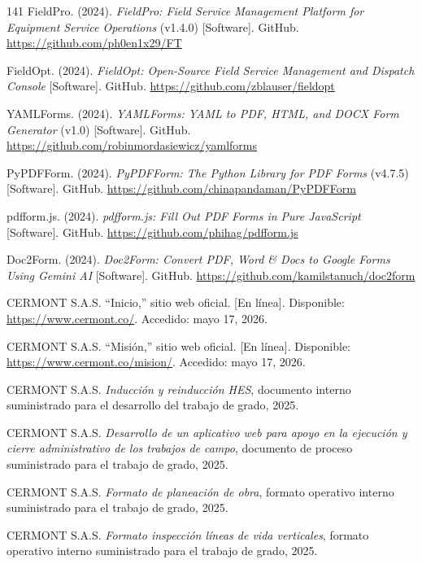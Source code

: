 \begin{thebibliography}{141}
FieldPro. (2024). \textit{FieldPro: Field Service Management Platform for Equipment Service Operations} (v1.4.0) [Software]. GitHub. \url{https://github.com/ph0en1x29/FT}

FieldOpt. (2024). \textit{FieldOpt: Open-Source Field Service Management and Dispatch Console} [Software]. GitHub. \url{https://github.com/zblauser/fieldopt}

YAMLForms. (2024). \textit{YAMLForms: YAML to PDF, HTML, and DOCX Form Generator} (v1.0) [Software]. GitHub. \url{https://github.com/robinmordasiewicz/yamlforms}

PyPDFForm. (2024). \textit{PyPDFForm: The Python Library for PDF Forms} (v4.7.5) [Software]. GitHub. \url{https://github.com/chinapandaman/PyPDFForm}

pdfform.js. (2024). \textit{pdfform.js: Fill Out PDF Forms in Pure JavaScript} [Software]. GitHub. \url{https://github.com/phihag/pdfform.js}

Doc2Form. (2024). \textit{Doc2Form: Convert PDF, Word \& Docs to Google Forms Using Gemini AI} [Software]. GitHub. \url{https://github.com/kamilstanuch/doc2form}


CERMONT S.A.S. ``Inicio,'' sitio web oficial. [En línea]. Disponible: \url{https://www.cermont.co/}. Accedido: mayo 17, 2026.

CERMONT S.A.S. ``Misión,'' sitio web oficial. [En línea]. Disponible: \url{https://www.cermont.co/mision/}. Accedido: mayo 17, 2026.

CERMONT S.A.S. \textit{Inducción y reinducción HES}, documento interno suministrado para el desarrollo del trabajo de grado, 2025.

CERMONT S.A.S. \textit{Desarrollo de un aplicativo web para apoyo en la ejecución y cierre administrativo de los trabajos de campo}, documento de proceso suministrado para el trabajo de grado, 2025.

CERMONT S.A.S. \textit{Formato de planeación de obra}, formato operativo interno suministrado para el trabajo de grado, 2025.

CERMONT S.A.S. \textit{Formato inspección líneas de vida verticales}, formato operativo interno suministrado para el trabajo de grado, 2025.


\end{thebibliography}
